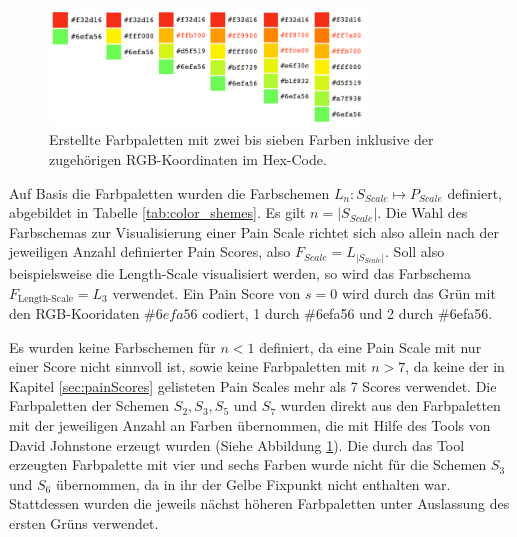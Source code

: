 \begin{figure}[h]
	\centering
	\includegraphics[width=0.75\textwidth]{bilder/colorpics.png}
	\caption{Erstellte Farbpaletten mit zwei bis sieben Farben inklusive der zugehörigen RGB-Koordinaten im Hex-Code.}
	\label{fig:color-swatches}
\end{figure}

Auf Basis die Farbpaletten wurden die Farbschemen $L_{n}: S_{Scale} \mapsto P_{Scale}$ definiert, abgebildet in Tabelle \ref{tab:color_shemes}. Es gilt $n = |S_{Scale}|$. Die Wahl des Farbschemas zur Visualisierung einer Pain Scale richtet sich also allein nach der jeweiligen Anzahl definierter Pain Scores, also $F_{Scale} = L_{|S_{Scale}|}$. Soll also beispielsweise die \glqq Length-Scale\grqq{} visualisiert werden, so wird das Farbschema $F_{\text{Length-Scale}} = L_3$ verwendet. Ein Pain Score von $s = 0$ wird durch das Grün mit den RGB-Kooridaten $\#6efa56$ codiert, 1 durch \#6efa56 und 2 durch \#6efa56.

Es wurden keine Farbschemen für $n<1$ definiert, da eine Pain Scale mit nur einer Score nicht sinnvoll ist, sowie keine Farbpaletten mit $n>7$, da keine der in Kapitel \ref{sec:painScores} gelisteten Pain Scales mehr als 7 Scores verwendet. Die Farbpaletten der Schemen $S_2, S_3, S_5$ und $S_7$ wurden direkt aus den Farbpaletten mit der jeweiligen Anzahl an Farben übernommen, die mit Hilfe des Tools von David Johnstone erzeugt wurden (Siehe Abbildung \ref{fig:color-swatches}). Die durch das Tool erzeugten Farbpalette mit vier und sechs Farben wurde nicht für die Schemen $S_3$ und $S_6$ übernommen, da in ihr der Gelbe Fixpunkt nicht enthalten war. Stattdessen wurden die jeweils nächst höheren Farbpaletten unter Auslassung des ersten Grüns verwendet. 

